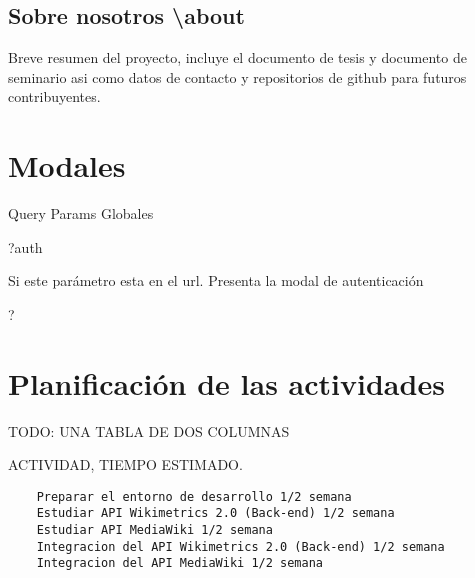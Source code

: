 \subsection{Sobre nosotros \textbackslash about} 
Breve resumen del proyecto, incluye el documento de tesis y documento de seminario asi como datos de contacto y repositorios de github para futuros contribuyentes.

\section{Modales}

Query Params Globales

?auth

Si este parámetro esta en el url. Presenta la modal de autenticación 

?

\section{Planificación de las actividades}

TODO: UNA TABLA DE DOS COLUMNAS

ACTIVIDAD, TIEMPO ESTIMADO.

\begin{lstlisting}
    Preparar el entorno de desarrollo 1/2 semana
    Estudiar API Wikimetrics 2.0 (Back-end) 1/2 semana
    Estudiar API MediaWiki 1/2 semana
    Integracion del API Wikimetrics 2.0 (Back-end) 1/2 semana
    Integracion del API MediaWiki 1/2 semana
\end{lstlisting}